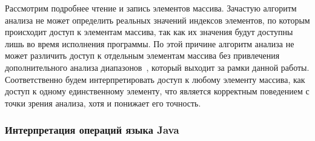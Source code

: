 \documentclass[14pt,titlepage]{extarticle}
\newcommand{\eng}[1]{{\English#1}}
\newcommand{\java}{\eng{Java}\xspace}
\begin{document}
      Рассмотрим подробнее чтение и запись элементов массива. Зачастую
      алгоритм анализа не может определить реальных значений индексов
      элементов, по которым происходит доступ к элементам массива, так как их
      значения будут доступны лишь во время исполнения программы.
      По этой причине алгоритм анализа не может различить доступ к отдельным
      элементам массива без привлечения дополнительного анализа
      диапазонов~\cite[раздел~8.12]{muchnick}, который выходит за рамки данной
      работы.
      Соответственно будем интерпретировать доступ к любому элементу массива,
      как доступ к одному единственному элементу, что является корректным
      поведением с точки зрения анализа, хотя и понижает его точность.

      \subsubsection{\texorpdfstring{Интерпретация операций языка \java}
                                    {Интерпретация операций языка Java}}
\end{document}
